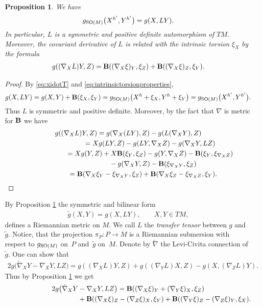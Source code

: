 \documentclass[pdftex]{sigma}
\numberwithin{equation}{section}
\newtheorem{Proposition}[Theorem]{Proposition}
\begin{document}
\begin{Proposition}\label{prop:PropertiesofL}
We have
\begin{gather*}
g_{{\rm SO}(M)}\big(X^{h'},Y^{h'}\big)=g(X,LY).
\end{gather*}
In particular, $L$ is a symmetric and positive definite automorphism of $TM$. Moreover, the covariant derivative of $L$ is related with the intrinsic torsion $\xi_X$ by the formula
\begin{gather*}
g((\nabla_XL)Y,Z)={\bf B}((\nabla_X\xi)_Y,\xi_Z)+{\bf B}((\nabla_X\xi)_Z,\xi_Y).
\end{gather*}
\end{Proposition}
\begin{proof}
By \eqref{eq:xidotT} and \eqref{eq:intrinsictorsionproperties},
\begin{gather*}
g(X,LY) =g(X,Y)+{\bf B}(\xi_X,\xi_Y)=g_{{\rm SO}(M)}\big(X^h+\xi_X,Y^h+\xi_Y\big) =g_{{\rm SO}(M)}\big(X^{h'},Y^{h'}\big).
\end{gather*}
Thus $L$ is symmetric and positive def\/inite. Moreover, by the fact that $\nabla$ is metric for ${\bf B}$ we have
\begin{gather*}
g((\nabla_XL)Y,Z)=g(\nabla_X(LY),Z)-g(L(\nabla_XY),Z)\\
\hphantom{g((\nabla_XL)Y,Z)}{} =Xg(LY,Z)-g(LY,\nabla_XZ)-g(\nabla_XY,LZ)\\
\hphantom{g((\nabla_XL)Y,Z)}{}=Xg(Y,Z)+X{\bf B}(\xi_Y,\xi_Z)-g(Y,\nabla_XZ)-{\bf B}(\xi_Y,\xi_{\nabla_XZ})\\
\hphantom{g((\nabla_XL)Y,Z)=}{}-g(\nabla_XY,Z)-{\bf B}(\xi_{\nabla_XY},\xi_Z)\\
\hphantom{g((\nabla_XL)Y,Z)}{}={\bf B}(\nabla_X\xi_Y-\xi_{\nabla_XY},\xi_Z) +{\bf B}(\nabla_X\xi_Z-\xi_{\nabla_XZ},\xi_Y).\tag*{\qed}
\end{gather*}\renewcommand{\qed}{}
\end{proof}

By Proposition \ref{prop:PropertiesofL} the symmetric and bilinear form
\begin{gather*}
\tilde{g}(X,Y)=g(X,LY),\qquad X,Y\in TM,
\end{gather*}
def\/ines a Riemannian metric on $M$. We call $L$ the {\it transfer tensor} between $g$ and~$\tilde g$. Notice, that the projection $\pi_P\colon P\to M$ is a Riemannian submersion with respect to $g_{{\rm SO}(M)}$ on~$P$ and~$\tilde{g}$ on~$M$. Denote by $\tilde{\nabla}$ the Levi-Civita connection of~$\tilde{g}$. One can show that \cite{gm}
\begin{gather*}%
2g\big(\tilde{\nabla}_XY-\nabla_XY,LZ\big)=g((\nabla_XL)Y,Z)+g((\nabla_YL)X,Z)-g(X,(\nabla_ZL)Y).
\end{gather*}
Thus by Proposition \ref{prop:PropertiesofL} we get
\begin{gather}
2g\big(\tilde{\nabla}_XY-\nabla_XY,LZ\big) ={\bf B}((\nabla_X\xi)_Y+(\nabla_Y\xi)_X,\xi_Z)\nonumber\\
\hphantom{2g\big(\tilde{\nabla}_XY-\nabla_XY,LZ\big) =}{} +{\bf B}((\nabla_X\xi)_Z-(\nabla_Z\xi)_X,\xi_Y)+{\bf B}((\nabla_Y\xi)_Z-(\nabla_Z\xi)_Y,\xi_X).\label{eq:differencetensor}
\end{gather}
\end{document}
